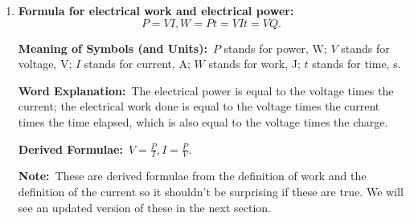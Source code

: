 \documentclass[8pt]{article}
\newcommand{\MeanSymb}{\textbf{Meaning of Symbols (and Units):}\ }
\newcommand{\WordExpl}{\textbf{Word Explanation:}\ }
\newcommand{\DeriForm}{\textbf{Derived Formulae:}\ }
\newcommand{\Note}{\textbf{Note:}\ }
\begin{document}
\begin{enumerate}
                \DeriForm \(Q = It, t = \frac{Q}{I}\).

                \Note We don't care about \(I = \frac{\Delta Q}{\Delta t}\) because we only study constant current at this stage. Current is \textbf{not} a vector, but current density is (we don't need to know that yet but just FYI.)

                \item \textbf{Formula for electrical work and electrical power:}
                \[
                    P = VI, W = Pt = VIt = VQ.
                \]

                \MeanSymb \(P\) stands for power, \unit{\watt}; \(V\) stands for voltage, \unit{\volt}; \(I\) stands for current, \unit{\ampere}; \(W\) stands for work, \unit{\joule}; \(t\) stands for time, \unit{\second}.

                \WordExpl The electrical power is equal to the voltage times the current; the electrical work done is equal to the voltage times the current times the time elapsed, which is also equal to the voltage times the charge.

                \DeriForm \(V = \frac{P}{I}, I = \frac{P}{V}\).

                \Note These are derived formulae from the definition of work and the definition of the current so it shouldn't be surprising if these are true. We will see an updated version of these in the next section.
            \end{enumerate}
\end{document}
